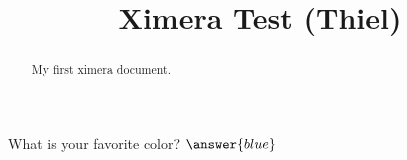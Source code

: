 \documentclass{ximera}
\title{Ximera Test (Thiel)}
\begin{document}
\begin{abstract}
My first ximera document.
\end{abstract}
\maketitle

What is your favorite color? $\answer{blue}$
\end{document}
